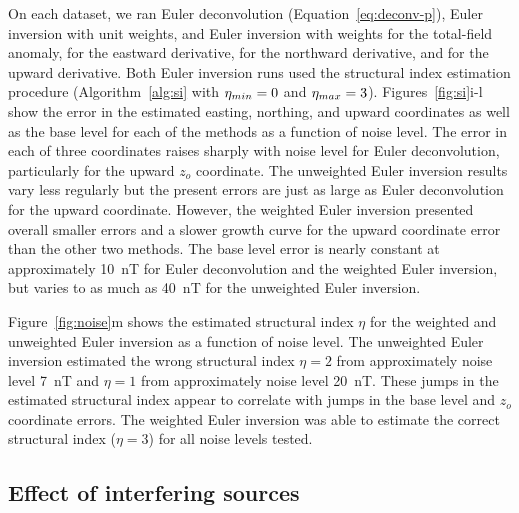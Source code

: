 On each dataset, we ran Euler deconvolution (Equation~\ref{eq:deconv-p}), Euler inversion with unit weights, and Euler inversion with weights \SynNoiseWeightsF{} for the total-field anomaly, \SynNoiseWeightsE{} for the eastward derivative, \SynNoiseWeightsN{} for the northward derivative, and \SynNoiseWeightsU{} for the upward derivative.
Both Euler inversion runs used the structural index estimation procedure
(Algorithm~\ref{alg:si} with $\eta_{min}=0$ and
$\eta_{max}=3$).
Figures~\ref{fig:si}i-l show the error in the estimated easting, northing, and upward coordinates as well as the base level for each of the methods as a function of noise level.
The error in each of three coordinates raises sharply with noise level for Euler deconvolution, particularly for the upward $z_o$ coordinate.
The unweighted Euler inversion results vary less regularly but the present errors are just as large as Euler deconvolution for the upward coordinate.
However, the weighted Euler inversion presented overall smaller errors and a slower growth curve for the upward coordinate error than the other two methods.
The base level error is nearly constant at approximately \qty{10}{\nano\tesla} for Euler deconvolution and the weighted Euler inversion, but varies to as much as \qty{40}{\nano\tesla} for the unweighted Euler inversion.

Figure~\ref{fig:noise}m shows the estimated structural index $\eta$ for the weighted and unweighted Euler inversion as a function of noise level.
The unweighted Euler inversion estimated the wrong structural index $\eta=2$ from approximately noise level \qty{7}{\nano\tesla} and $\eta=1$ from approximately noise level \qty{20}{\nano\tesla}.
These jumps in the estimated structural index appear to correlate with jumps in the base level and $z_o$ coordinate errors.
The weighted Euler inversion was able to estimate the correct structural index ($\eta=3$) for all noise levels tested.


\subsection{Effect of interfering sources}
\label{sec:interf}

